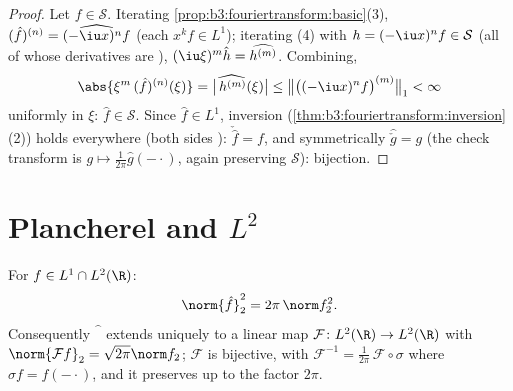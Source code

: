 \begin{proof}
Let $f \in \mathcal S$. Iterating
\cref{prop:b3:fouriertransform:basic}(3), $(\hat f)^{(n)} =
\widehat{(-\iu x)^nf}$ (each $x^kf \in L^1$); iterating (4)
with $h = (-\iu x)^nf \in \mathcal S$ (all of whose
derivatives are ), $(\iu\xi)^m\hat h =
\widehat{h^{(m)}}$. Combining,
\[
\abs{\xi^m\,(\hat f)^{(n)}(\xi)}
= \bigl|\widehat{\,h^{(m)}}(\xi)\bigr|
\leq \bigl\|\bigl((-\iu x)^nf\bigr)^{(m)}\bigr\|_1 < \infty
\]
uniformly in $\xi$: $\hat f \in \mathcal S$. Since $\hat f \in L^1$, inversion
(\cref{thm:b3:fouriertransform:inversion}(2)) holds
everywhere (both sides ): $\check{\hat f} = f$, and
symmetrically $\widehat{\check g} = g$ (the check transform
is $g \mapsto \frac1{2\pi}\hat g(-\cdot)$, again preserving
$\mathcal S$): bijection.
\end{proof}

\section{Plancherel and \texorpdfstring{$L^2$}{L2}}

\begin{theorem}[Plancherel]\label{thm:b3:fouriertransform:plancherel}
For $f \in L^1 \cap L^2(\R)$:
\[
\norm{\hat f}_2^2 = 2\pi\,\norm f_2^2 .
\]
Consequently $\widehat{\phantom f}$ extends uniquely to a
 linear map $\mathcal F \colon L^2(\R) \to L^2(\R)$
with $\norm{\mathcal Ff}_2 = \sqrt{2\pi}\norm f_2$; $\mathcal
F$ is bijective, with $\mathcal F^{-1} =
\frac1{2\pi}\,\mathcal F\circ\sigma$ where $\sigma f =
f(-\cdot)$, and it preserves  up to the factor
$2\pi$.
\end{theorem}


